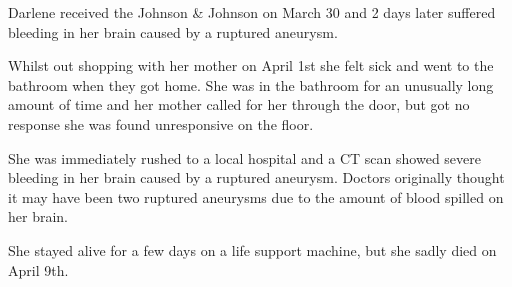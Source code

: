 Darlene received the Johnson \& Johnson on March 30 and 2 days later suffered
bleeding in her brain caused by a ruptured aneurysm.

Whilst out shopping with her mother on April 1st she felt sick and went to the
bathroom when they got home. She was in the bathroom for an unusually long
amount of time and her mother called for her through the door, but got no
response she was found unresponsive on the floor.

She was immediately rushed to a local hospital and a CT scan showed severe
bleeding in her brain caused by a ruptured aneurysm. Doctors originally thought
it may have been two ruptured aneurysms due to the amount of blood spilled on
her brain.

She stayed alive for a few days on a life support machine, but she sadly died on
April 9th.

